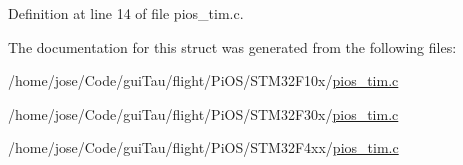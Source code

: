 Definition at line 14 of file pios\-\_\-tim.\-c.



The documentation for this struct was generated from the following files\-:\begin{DoxyCompactItemize}
\item 
/home/jose/\-Code/gui\-Tau/flight/\-Pi\-O\-S/\-S\-T\-M32\-F10x/\hyperlink{_s_t_m32_f10x_2pios__tim_8c}{pios\-\_\-tim.\-c}\item 
/home/jose/\-Code/gui\-Tau/flight/\-Pi\-O\-S/\-S\-T\-M32\-F30x/\hyperlink{_s_t_m32_f30x_2pios__tim_8c}{pios\-\_\-tim.\-c}\item 
/home/jose/\-Code/gui\-Tau/flight/\-Pi\-O\-S/\-S\-T\-M32\-F4xx/\hyperlink{_s_t_m32_f4xx_2pios__tim_8c}{pios\-\_\-tim.\-c}\end{DoxyCompactItemize}
